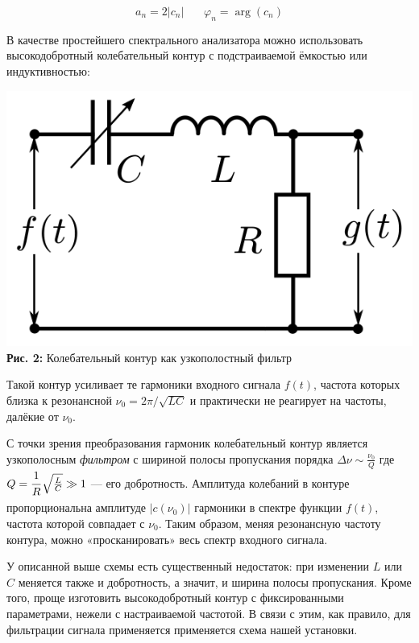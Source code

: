 \documentclass[12pt,a4paper]{scrartcl}
\begin{document}
	$$a_n = 2|c_n| \ \ \ \ \ \ \ \ \varphi_n = \arg (c_n)$$
	
	В качестве простейшего спектрального анализатора можно использовать высокодобротный	колебательный контур с подстраиваемой ёмкостью или индуктивностью:
	
	\begin{center}
		\includegraphics[scale=0.25]{PIC_2.png}
		\\\textbf{Рис. 2:} Колебательный контур как узкополостный фильтр
	\end{center}

	Такой контур усиливает те гармоники входного сигнала $f(t)$, частота которых близка к резонансной $\nu_0 = 2\pi / \sqrt{LC}$ и практически не реагирует на частоты, далёкие от $\nu_0$.
	
	С точки зрения преобразования гармоник колебательный контур является узкополосным \textit{фильтром} с шириной полосы пропускания порядка $\Delta \nu \sim \frac{\nu_0}{Q}$ где $Q = \dfrac{\strut 1}{\strut R} \sqrt{\frac{L}{C}} \gg 1$ — его добротность. Амплитуда колебаний в контуре пропорциональна амплитуде $|c(\nu_0)|$ гармоники в спектре функции $f(t)$, частота которой совпадает с $\nu_0$. Таким образом, меняя резонансную частоту контура, можно «просканировать» весь спектр входного сигнала.
	
	У описанной выше схемы есть существенный недостаток: при изменении $L$ или $C$ меняется также и добротность, а значит, и ширина полосы пропускания. Кроме того, проще изготовить высокодобротный контур с фиксированными параметрами, нежели с настраиваемой частотой. В связи с этим, как правило, для фильтрации сигнала применяется применяется схема нашей установки.
	
	\newpage
	
	
\end{document}
